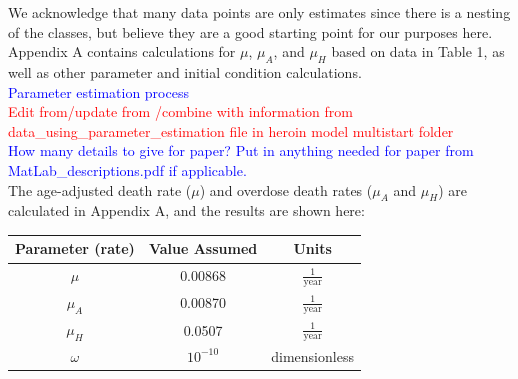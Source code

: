 \documentclass[12pt]{article}
\begin{document}














We acknowledge that many data points are only estimates since there is a nesting of the classes, but believe they are a good starting point for our purposes here. Appendix A contains calculations for $\mu$, $\mu_A$, and $\mu_H$ based on data in Table 1, as well as other parameter and initial condition calculations.  \\



\textcolor{blue}{Parameter estimation process} \\
\textcolor{red}{Edit from/update from /combine with information from data\_using\_parameter\_estimation file in heroin model multistart folder} \\
\textcolor{blue}{How many details to give for paper? Put in anything needed for paper from MatLab\_descriptions.pdf if applicable.} \\

The age-adjusted death rate ($\mu$) and overdose death rates ($\mu_{A}$ and $\mu_{H}$) are calculated in Appendix A, and the results are shown here:

\begin{center}

\begin{tabular}{|c | c | c|}

 \hline

{Parameter (rate)} & {Value Assumed} & {Units} \\ [0.5ex]

 \hline\hline

$\mu$ & 0.00868 & $\frac{1}{\text{year}}$  \\

\hline

$\mu_A$& 0.00870  & $\frac{1}{\text{year}}$   \\

\hline

$\mu_H$ & 0.0507 & $\frac{1}{\text{year}}$  \\

\hline

$\omega$ &  $10^{-10}$ & \scriptsize{dimensionless}   \\

\hline
\end{tabular}

\end{center}
 
\end{document}

